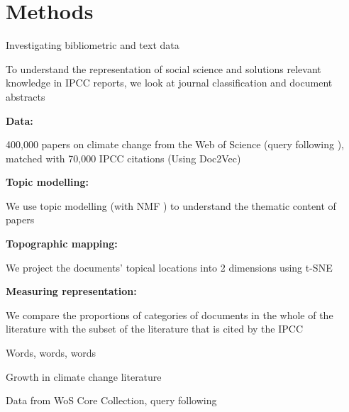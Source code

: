 \documentclass[9pt, aspectratio=169]{beamer}
\begin{document}
\section{Methods}
\frame{\tableofcontents[currentsection]}

\begin{frame}{Investigating bibliometric and text data}

To understand the representation of social science and solutions relevant knowledge in IPCC reports, we look at journal classification and document abstracts

\bigskip

\textbf{Data:}

400,000 papers on climate change from the Web of Science (query following \cite{Grieneisen2011}), matched with 70,000 IPCC citations (Using Doc2Vec)

\bigskip

\textbf{Topic modelling:}

We use topic modelling (with NMF \citep{Lee1999}) to understand the thematic content of papers

\bigskip

\textbf{Topographic mapping:}

We project the documents' topical locations into 2 dimensions using t-SNE \citep{vandermaaten2008} 

\bigskip

\textbf{Measuring representation:}

We compare the proportions of categories of documents in the whole of the literature with the subset of the literature that is cited by the IPCC

\end{frame}


\begin{frame}{Words, words, words}

\begin{table}[h]
	\begin{adjustbox}{width=0.8\linewidth}
		
	\end{adjustbox}			
	\caption{Growth in climate change literature}
	\label{growthtable}
\end{table}	

%			

Data from WoS Core Collection, query following \citet{Grieneisen2011}

\end{frame}
\end{document}
